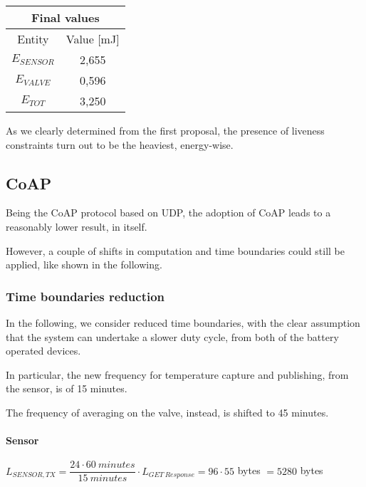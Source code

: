 \documentclass[a4paper,11pt]{article} %
\begin{document}
    \begin{center}
        \begin{tabular}{|c|c|}
            \hline
            \multicolumn{2}{|c|}{Final values} \\
            \hline
            Entity       & Value [mJ] \\
            \hline
            $E_{SENSOR}$ & 2,655      \\
            \hline
            $E_{VALVE}$  & 0,596      \\
            \hline
            $E_{TOT}$    & 3,250      \\
            \hline
        \end{tabular}
    \end{center}

    As we clearly determined from the first proposal, the presence of liveness constraints turn out to be the heaviest, energy-wise.

    \subsection{CoAP}

    Being the CoAP protocol based on UDP, the adoption of CoAP leads to a reasonably lower result, in itself.

    However, a couple of shifts in computation and time boundaries could still be applied, like shown in the following.

    \subsubsection{Time boundaries reduction}

    In the following, we consider reduced time boundaries, with the clear assumption that the system can undertake a slower duty cycle, from both of the battery operated devices.

    In particular, the new frequency for temperature capture and publishing, from the sensor, is of 15 minutes.

    The frequency of averaging on the valve, instead, is shifted to 45 minutes.

    \paragraph{Sensor}

    $L_{SENSOR, TX} = \dfrac{24 \cdot 60\ minutes}{15\ minutes} \cdot L_{GET\ Response} = 96 \cdot 55$ bytes $ = 5280$ bytes
\end{document}
